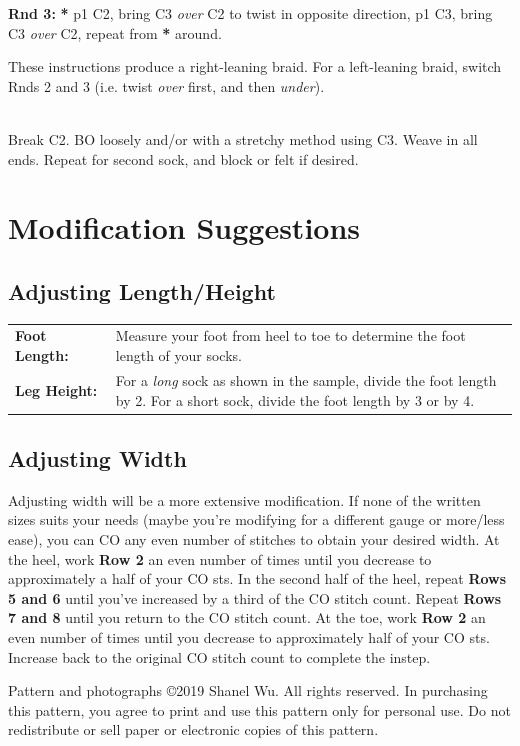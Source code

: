\documentclass[12pt]{article}
\newcommand{\rowDir}[1]{\textbf{#1:}} %
\newcommand{\repmark}{\textbf{*}}
\newcommand{\longrepeat}[1]{\textbf{\repmark} #1, repeat from \repmark}%
\newcommand{\blank}{\underline{\hspace{2em}} } %
\newenvironment{frnote}
    {%
    	\setlength{\FrameRule}{1.5pt}
    	\def\FrameCommand{\fboxrule=\FrameRule\fboxsep=\FrameSep \fcolorbox{framecolor}{shadecolor}}
    	\MakeFramed {\FrameRestore}}
    {\setlength{\FrameRule}{1pt}
	\endMakeFramed}
\begin{document}
\rowDir{Rnd 3} \longrepeat{p1 C2, bring C3 \emph{over} C2 to twist in opposite direction, p1 C3, bring C3 \emph{over} C2} around.

These instructions produce a right-leaning braid. For a left-leaning braid, switch Rnds 2 and 3 (i.e. twist \emph{over} first, and then \emph{under}).

~\\
Break C2. BO loosely and/or with a stretchy method using C3. Weave in all ends. Repeat for second sock, and block or felt if desired.

\section*{Modification Suggestions}
\subsection*{Adjusting Length/Height}

\begin{tabular}{p{0.2\linewidth} p{0.8\linewidth}}
\textbf{Foot Length: \blank} &  Measure your foot from heel to toe to determine the foot length of your socks. \\

\textbf{Leg Height: \blank} & For a \emph{long} sock as shown in the sample, divide the foot length by 2. For a short sock, divide the foot length by 3 or by 4. \\
\end{tabular}

\subsection*{Adjusting Width}
Adjusting width will be a more extensive modification. If none of the written sizes suits your needs (maybe you're modifying for a different gauge or more/less ease), you can CO any even number of stitches to obtain your desired width. At the heel, work \textbf{Row 2} an even number of times until you decrease to approximately a half of your CO sts. In the second half of the heel, repeat \textbf{Rows 5 and 6} until you've increased by a third of the CO stitch count. Repeat \textbf{Rows 7 and 8} until you return to the CO stitch count. At the toe, work \textbf{Row 2} an even number of times until you decrease to approximately half of your CO sts. Increase back to the original CO stitch count to complete the instep.


\begin{frnote} \ssmall
Pattern and photographs \copyright 2019 Shanel Wu.
All rights reserved. In purchasing this pattern, you agree to print and use this pattern only for personal use. Do not redistribute or sell paper or electronic copies of this pattern.
\end{frnote}
\end{document}
